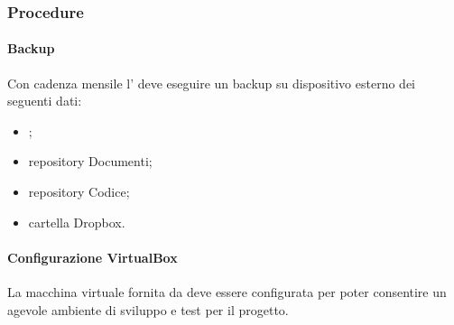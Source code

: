 	\subsubsection{Procedure}
	\paragraph{Backup}
	Con cadenza mensile l'\amministratore{} deve eseguire un backup su dispositivo esterno dei seguenti dati:
	\begin{itemize}
		\item {} ;
		\item repository Documenti;
		\item repository Codice;
		\item cartella Dropbox.
	\end{itemize}
	\paragraph{Configurazione VirtualBox}
	La macchina virtuale fornita da \riskapp{} deve essere configurata per poter consentire un agevole ambiente di sviluppo e test per il progetto.
	

